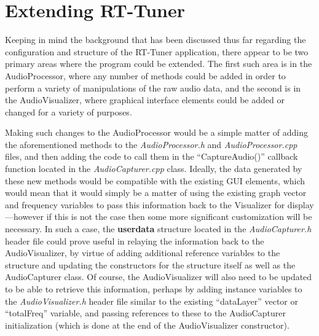 \documentclass[12pt]{report}
\begin{document}
\section{Extending RT-Tuner}
\indent Keeping in mind the background that has been discussed thus far regarding the configuration and structure of the RT-Tuner application, there appear to be two primary areas where the program could be extended. The first such area is in the AudioProcessor, where any number of methods could be added in order to perform a variety of manipulations of the raw audio data, and the second is in the AudioVisualizer, where graphical interface elements could be added or changed for a variety of purposes.

\indent Making such changes to the AudioProcessor would be a simple matter of adding the aforementioned methods to the \emph{AudioProcessor.h} and \emph{AudioProcessor.cpp} files, and then adding the code to call them in the ``CaptureAudio()'' callback function located in the \emph{AudioCapturer.cpp} class. Ideally, the data generated by these new methods would be compatible with the existing GUI elements, which would mean that it would simply be a matter of using the existing graph vector and frequency variables to pass this information back to the Visualizer for display---however if this is not the case then some more significant customization will be necessary. In such a case, the {\bf userdata} structure located in the \emph{AudioCapturer.h} header file could prove useful in relaying the information back to the AudioVisualizer, by virtue of adding additional reference variables to the structure and updating the constructors for the structure itself as well as the AudioCapturer class. Of course, the AudioVisualizer will also need to be updated to be able to retrieve this information, perhaps by adding instance variables to the \emph{AudioVisualizer.h} header file similar to the existing ``dataLayer'' vector or ``totalFreq'' variable, and passing references to these to the AudioCapturer initialization (which is done at the end of the AudioVisualizer constructor).
\end{document}
